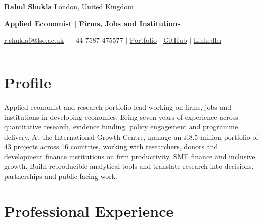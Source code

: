 \documentclass[10pt,a4paper]{article}
\newcommand{\link}[2]{\href{#1}{\color{teal}#2}}
\begin{document}
{\fontsize{27}{30}\selectfont\bfseries\color{navy} Rahul Shukla}\hfill
{\sffamily\small\color{muted} London, United Kingdom}

\vspace{1pt}
{\sffamily\small\bfseries\color{teal} Applied Economist \enspace $\vert$ \enspace Firms, Jobs and Institutions}

\vspace{3pt}
{\sffamily\small
\href{mailto:r.shukla6@lse.ac.uk}{r.shukla6@lse.ac.uk} \enspace $\vert$ \enspace
+44 7587 475577 \enspace $\vert$ \enspace
\link{https://rahulsh97.github.io}{Portfolio} \enspace $\vert$ \enspace
\link{https://github.com/rahulsh97}{GitHub} \enspace $\vert$ \enspace
\link{https://www.linkedin.com/in/rahulshuklamzp}{LinkedIn}}

\vspace{7pt}
{\color{teal}\rule{\textwidth}{1.5pt}}

\section*{Profile}
Applied economist and research portfolio lead working on firms, jobs and institutions in developing economies. Bring seven years of experience across quantitative research, evidence funding, policy engagement and programme delivery. At the International Growth Centre, manage an \pounds8.5 million portfolio of 43 projects across 16 countries, working with researchers, donors and development finance institutions on firm productivity, SME finance and inclusive growth. Build reproducible analytical tools and translate research into decisions, partnerships and public-facing work.

\section*{Professional Experience}
\end{document}
